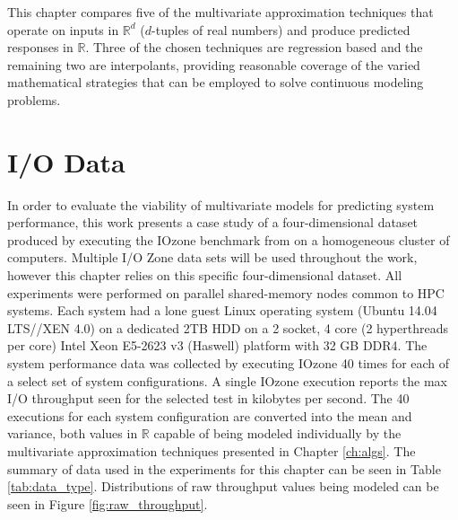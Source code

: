 
This chapter compares five of the multivariate approximation
techniques that operate on inputs in $\mathbb{R}^d$ ($d$-tuples of
real numbers) and produce predicted responses in $\mathbb{R}$. Three
of the chosen techniques are regression based and the remaining two
are interpolants, providing reasonable coverage of the varied
mathematical strategies that can be employed to solve continuous
modeling problems.

\section{I/O Data}

In order to evaluate the viability of multivariate models for
predicting system performance, this work presents a case study of a
four-dimensional dataset produced by executing the IOzone benchmark
from \citet{iozone} on a homogeneous cluster of computers. Multiple
I/O Zone data sets will be used throughout the work, however this
chapter relies on this specific four-dimensional dataset. All
experiments were performed on parallel shared-memory nodes common to
HPC systems. Each system had a lone guest Linux operating system
(Ubuntu 14.04 LTS//XEN 4.0) on a dedicated 2TB HDD on a 2 socket, 4
core (2 hyperthreads per core) Intel Xeon E5-2623 v3 (Haswell)
platform with 32 GB DDR4. The system performance data was collected by
executing IOzone 40 times for each of a select set of system
configurations. A single IOzone execution reports the max I/O
throughput seen for the selected test in kilobytes per second. The 40
executions for each system configuration are converted into the mean
and variance, both values in $\mathbb{R}$ capable of being modeled
individually by the multivariate approximation techniques presented in
Chapter \ref{ch:algs}. The summary of data used in the experiments for
this chapter can be seen in Table \ref{tab:data_type}.  Distributions
of raw throughput values being modeled can be seen in Figure
\ref{fig:raw_throughput}.

